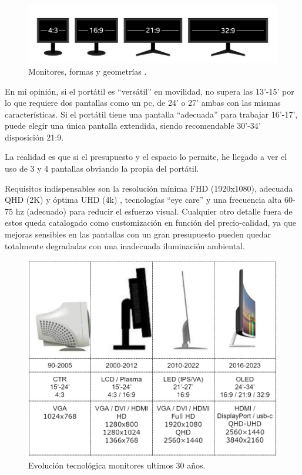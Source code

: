 \begin{figure}[!htb]
\begin{center}
\includegraphics[width=1\textwidth]{./figuras/pantallas_geometria.jpg}
\caption{Monitores, formas y geometrías \cite{i_pantallas}. }
\label{F:pantallas_geometria}
\end{center}
\end{figure}

En mi opinión, si el portátil es “versátil” en movilidad, no supera las 13’-15’ por lo que requiere dos pantallas como un pc, de 24’ o 27’ ambas con las mismas características. Si el portátil tiene una pantalla “adecuada” para trabajar 16’-17’, puede elegir una única pantalla extendida, siendo recomendable 30’-34’ disposición 21:9.

La realidad es que si el presupuesto y el espacio lo permite, he llegado a ver el uso de 3 y 4 pantallas obviando la propia del portátil.

Requisitos indispensables son la resolución mínima FHD (1920x1080), adecuada QHD (2K) y óptima UHD (4k) , tecnologías “eye care” y una frecuencia alta 60-75 hz (adecuado) para reducir el esfuerzo visual. Cualquier otro detalle fuera de estos queda catalogado como customización en función del precio-calidad, ya que mejoras sensibles en las pantallas con un gran presupuesto pueden quedar totalmente degradadas con una inadecuada iluminación ambiental.

\begin{figure}[!htb]
\begin{center}
\includegraphics[width=1\textwidth]{./figuras/comparacion_monitor_tech.jpg}
\caption{ Evolución tecnológica monitores ultimos 30 años.}
\label{F:comparacion_monitor_tech}
\end{center}
\end{figure}

